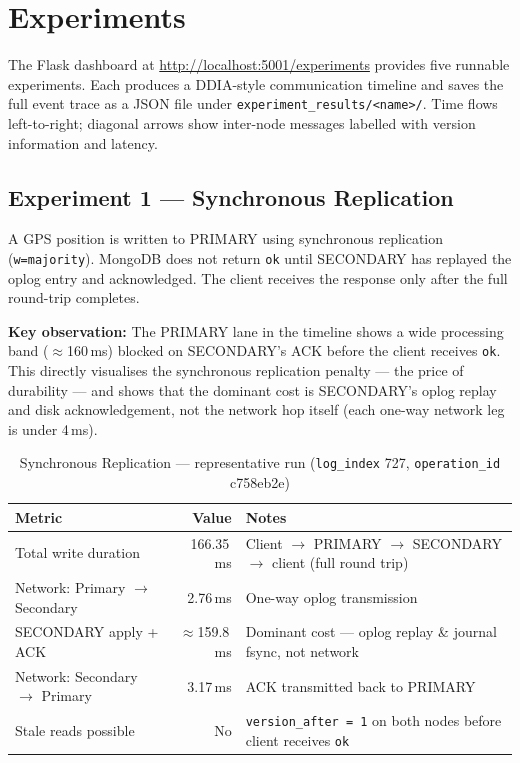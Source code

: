 \documentclass[12pt,a4paper]{article}
\newcommand{\code}[1]{\texttt{\small #1}}
\begin{document}
\section{Experiments}

The Flask dashboard at \url{http://localhost:5001/experiments} provides five runnable
experiments. Each produces a DDIA-style communication timeline and saves the full event
trace as a JSON file under \code{experiment\_results/<name>/}. Time flows left-to-right;
diagonal arrows show inter-node messages labelled with version information and latency.

\subsection{Experiment 1 --- Synchronous Replication}

A GPS position is written to PRIMARY using synchronous replication (\code{w=majority}).
MongoDB does not return \code{ok} until SECONDARY has replayed the oplog entry and
acknowledged. The client receives the response only after the full round-trip completes.

\textbf{Key observation:} The PRIMARY lane in the timeline shows a wide processing band
($\approx$160\,ms) blocked on SECONDARY's ACK before the client receives \code{ok}. This
directly visualises the synchronous replication penalty --- the price of durability ---
and shows that the dominant cost is SECONDARY's oplog replay and disk acknowledgement,
not the network hop itself (each one-way network leg is under 4\,ms).

\begin{table}[H]
  \centering
  \caption{Synchronous Replication --- representative run (\code{log\_index} 727, \code{operation\_id} c758eb2e)}
  \begin{tabularx}{\textwidth}{lrX}
    \toprule
    Metric & Value & Notes \\
    \midrule
    Total write duration       & 166.35\,ms     & Client $\to$ PRIMARY $\to$ SECONDARY $\to$ client (full round trip) \\
    Network: Primary $\to$ Secondary & 2.76\,ms & One-way oplog transmission \\
    SECONDARY apply + ACK      & $\approx$159.8\,ms & Dominant cost --- oplog replay \& journal fsync, not network \\
    Network: Secondary $\to$ Primary & 3.17\,ms & ACK transmitted back to PRIMARY \\
    Stale reads possible       & No             & \code{version\_after = 1} on both nodes before client receives \code{ok} \\
    \bottomrule
  \end{tabularx}
\end{table}
\end{document}
